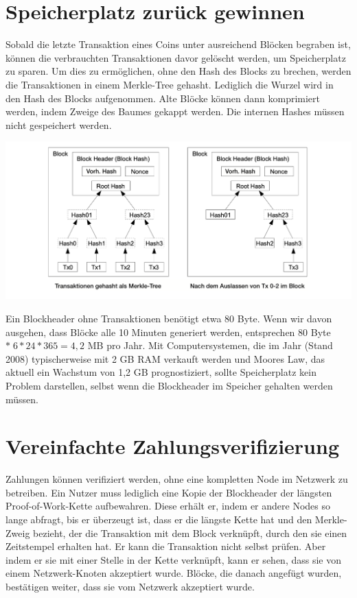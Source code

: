 \documentclass[9pt]{article}
\begin{document}
	\section{Speicherplatz zurück gewinnen}
	
	Sobald die letzte Transaktion eines Coins unter ausreichend Blöcken begraben ist, können die verbrauchten Transaktionen davor gelöscht werden, um Speicherplatz zu sparen. Um dies zu ermöglichen, ohne den Hash des Blocks zu brechen, werden die Transaktionen in einem Merkle-Tree \cite{merkle}\cite{massias}\cite{haber2} gehasht. Lediglich die Wurzel wird in den Hash des Blocks aufgenommen. Alte Blöcke können dann komprimiert werden, indem Zweige des Baumes gekappt werden. Die internen Hashes müssen nicht gespeichert werden.
	
	\begin{center}
		\includegraphics[width=\textwidth]{pics/reclaimingdiskspace.png}
	\end{center}
	
	Ein Blockheader ohne Transaktionen benötigt etwa 80 Byte. Wenn wir davon ausgehen, dass Blöcke alle 10 Minuten generiert werden, entsprechen 80 Byte $* \;6 * 24 * 365 = 4,2$ MB pro Jahr. Mit Computersystemen, die im Jahr (Stand 2008) typischerweise mit 2 GB RAM verkauft werden und Moores Law, das aktuell ein Wachstum von 1,2 GB prognostiziert, sollte Speicherplatz kein Problem darstellen, selbst wenn die Blockheader im Speicher gehalten werden müssen.
	
	\newpage
	
	\section{Vereinfachte Zahlungsverifizierung}
	
    Zahlungen können verifiziert werden, ohne eine kompletten Node im Netzwerk zu betreiben. Ein Nutzer muss lediglich eine Kopie der Blockheader der längsten Proof-of-Work-Kette aufbewahren. Diese erhält er, indem er andere Nodes so lange abfragt, bis er überzeugt ist, dass er die längste Kette hat und den Merkle-Zweig bezieht, der die Transaktion mit dem Block verknüpft, durch den sie einen Zeitstempel erhalten hat. Er kann die Transaktion nicht selbst prüfen. Aber indem er sie mit einer Stelle in der Kette verknüpft, kann er sehen, dass sie von einem Netzwerk-Knoten akzeptiert wurde. Blöcke, die danach angefügt wurden, bestätigen weiter, dass sie vom Netzwerk akzeptiert wurde.
	
\end{document}
